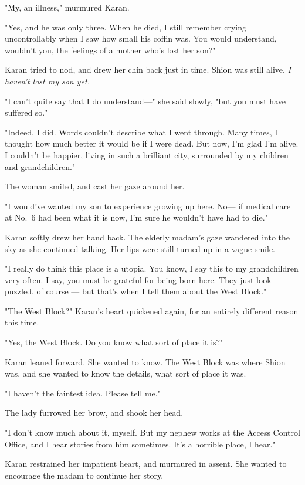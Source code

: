 "My, an illness," murmured Karan.

"Yes, and he was only three. When he died, I still remember crying
uncontrollably when I saw how small his coffin was. You would
understand, wouldn't you, the feelings of a mother who's lost her son?"

Karan tried to nod, and drew her chin back just in time. Shion was still
alive. \emph{I haven't lost my son yet.}

"I can't quite say that I do understand---" she said slowly, "but you must
have suffered so."

"Indeed, I did. Words couldn't describe what I went through. Many times,
I thought how much better it would be if I were dead. But now, I'm glad
I'm alive. I couldn't be happier, living in such a brilliant city,
surrounded by my children and grandchildren."

The woman smiled, and cast her gaze around her.

"I would've wanted my son to experience growing up here. No--- if medical
care at No.~6 had been what it is now, I'm sure he wouldn't have had to
die."

Karan softly drew her hand back. The elderly madam's gaze wandered into
the sky as she continued talking. Her lips were still turned up in a
vague smile.

"I really do think this place is a utopia. You know, I say this to my
grandchildren very often. I say, you must be grateful for being born
here. They just look puzzled, of course --- but that's when I tell them
about the West Block."

"The West Block?" Karan's heart quickened again, for an entirely
different reason this time.

"Yes, the West Block. Do you know what sort of place it is?"

Karan leaned forward. She wanted to know. The West Block was where Shion
was, and she wanted to know the details, what sort of place it was.

"I haven't the faintest idea. Please tell me."

The lady furrowed her brow, and shook her head.

"I don't know much about it, myself. But my nephew works at the Access
Control Office, and I hear stories from him sometimes. It's a horrible
place, I hear."

Karan restrained her impatient heart, and murmured in assent. She wanted
to encourage the madam to continue her story.

